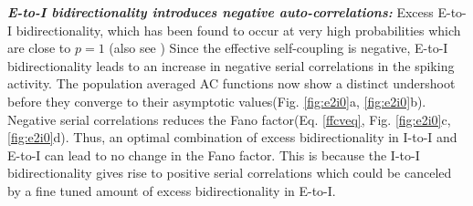 \emph{\textbf{E-to-I bidirectionality introduces negative auto-correlations:}} Excess E-to-I bidirectionality, which has been found to occur at very high probabilities which are close to $p=1$ \cite{Yoshimura2005, Otsuka2009}(also see \cite{Avermann2012}) %
Since the effective self-coupling is negative, E-to-I bidirectionality leads to an increase in negative serial correlations in the spiking activity. The population averaged AC functions now show a distinct undershoot before they converge to their asymptotic values(Fig. \ref{fig:e2i0}a, \ref{fig:e2i0}b). Negative serial correlations reduces the Fano factor(Eq. \ref{ffcveq}, Fig. \ref{fig:e2i0}c, \ref{fig:e2i0}d). Thus, an optimal combination of excess bidirectionality in I-to-I and E-to-I can lead to no change in the Fano factor. This is because the I-to-I bidirectionality gives rise to positive serial correlations which could be canceled by a fine tuned amount of excess bidirectionality in E-to-I. \\

